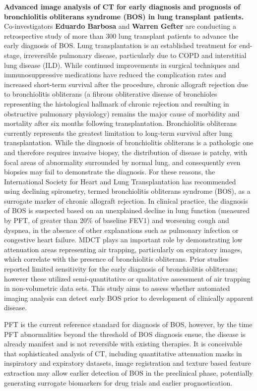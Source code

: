 \documentclass[11pt,]{article}
\begin{document}
\textbf{Advanced image analysis of CT for early diagnosis and prognosis
of bronchiolitis obliterans syndrome (BOS) in lung transplant patients.}
Co-investigators \textbf{Eduardo Barbosa} and \textbf{Warren Gefter} are
conducting a retrospective study of more than 300 lung transplant
patients to advance the early diagnosis of BOS. Lung transplantation is
an established treatment for end-stage, irreversible pulmonary disease,
particularly due to COPD and interstitial lung disease (ILD). While
continued improvements in surgical techniques and immunosuppressive
medications have reduced the complication rates and increased short-term
survival after the procedure, chronic allograft rejection due to
bronchiolitis obliterans (a fibrous obliterative disease of bronchioles
representing the histological hallmark of chronic rejection and
resulting in obstructive pulmonary physiology) remains the major cause
of morbidity and mortality after six months following transplantation.
Bronchiolitis obliterans currently represents the greatest limitation to
long-term survival after lung transplantation. While the diagnosis of
bronchiolitis obliterans is a pathologic one and therefore requires
invasive biopsy, the distribution of disease is patchy, with focal areas
of abnormality surrounded by normal lung, and consequently even biopsies
may fail to demonstrate the diagnosis. For these reasons, the
International Society for Heart and Lung Transplantation has recommended
using declining spirometry, termed bronchiolitis obliterans syndrome
(BOS), as a surrogate marker of chronic allograft rejection. In clinical
practice, the diagnosis of BOS is suspected based on an unexplained
decline in lung function (measured by PFT, of greater than 20\% of
baseline FEV1) and worsening cough and dyspnea, in the absence of other
explanations such as pulmonary infection or congestive heart failure.
MDCT plays an important role by demonstrating low attenuation areas
representing air trapping, particularly on expiratory images, which
correlate with the presence of bronchiolitis obliterans. Prior studies
reported limited sensitivity for the early diagnosis of bronchiolitis
obliterans; however these utilized semi-quantitative or qualitative
assessment of air trapping in non-volumetric data sets. This study aims
to assess whether automated imaging analysis can detect early BOS prior
to development of clinically apparent disease.

PFT is the current reference standard for diagnosis of BOS, however, by
the time PFT abnormalities beyond the threshold of BOS diagnosis ensue,
the disease is already manifest and is not reversible with existing
therapies. It is conceivable that sophisticated analysis of CT,
including quantitative attenuation masks in inspiratory and expiratory
datasets, image registration and texture based feature extraction may
allow earlier detection of BOS in the preclinical phase, potentially
generating surrogate biomarkers for drug trials and earlier
prognostication.
\end{document}
